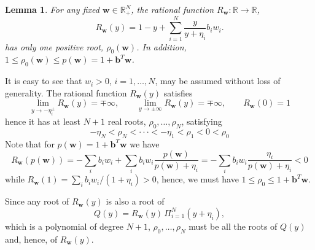 \documentclass[preprint]{elsarticle}
\newtheorem{lemma}{Lemma}[section]
\theoremstyle{definition}
\newcommand{\bbw}{{\boldsymbol w}}
\def\rpn{\mathbb{R}_+^N}
\newcommand{\bw}{\boldsymbol w}
\newcommand{\bb}{\boldsymbol b}
\begin{document}
\begin{lemma} \label{lemma:1}
For any fixed $\bw \in \rpn$, the rational function $R_{\bw}:
  \mathbb{R}  \rightarrow   \mathbb{R}$, 
\begin{equation} \label{eq:Rp-def}
R_{\bw}(y)=1-y+\sum_{i=1}^N \frac{y}{y+\eta_i} b_i w_i.
\end{equation} 
 has only one positive root, $\rho_0(\bw)$. In
addition,  $1 \leq \rho_0(\bw) \leq p(\bw)=1+ \bb^T \bw$.
\end{lemma}
\begin{pf}
  It is easy to see that $w_i>0$, $i=1,\dots,N$, may be assumed without loss of
    generality. 
 The  rational function $R_{\bw}(y)$ 
satisfies
\begin{equation*}
\lim_{y\to -\eta_i^\pm}R_{\bw}(y)=\mp \infty,  \qquad  
\lim_{y\to \pm \infty}R_{\bw}(y)=\mp \infty, \qquad R_{\bw}(0)=1
\end{equation*}
hence it has at least $N+1$ real roots,  $\rho_0, \ldots, \rho_N$, satisfying
\[   -\eta_N < \rho_N <  \cdot\cdot\cdot < -\eta_1 < \rho_1 < 0 <\rho_0\]
Note that for  $p(\bbw)=1+\bb^T \bbw$ we have
\[ R_{\bw}(p(\bw))= -\sum_i b_i w_i + \sum_i b_i w_i 
\frac{p(\bw)}{p(\bw) +  \eta_i} 
= -\sum_i b_i w_i \frac{\eta_i}{p(\bw) +
  \eta_i} <0 \]
while  $R_{\bw}(1)=\sum_i b_i w_i /(1+\eta_i) > 0$,
hence, we must have $1 \leq \rho_0 \leq 1+ \bb^T \bw$.
 
 Since any root of $R_{\bw}(y)$ is also a root of 
\[Q(y)=R_{\bw}(y)\, \Pi_{i=1}^N (y+\eta_i), \]
which is a polynomial of degree $N+1$, $\rho_0,\ldots,\rho_N$ must be all
the roots of $Q(y)$ and, hence, of $R_{\bw}(y)$.

\end{pf}
\end{document}
